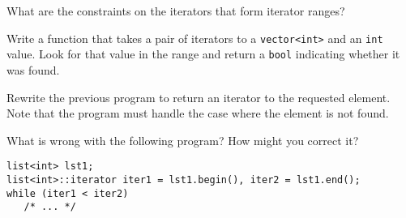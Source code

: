 %
%
\begin{question}
What are the constraints on the iterators that form iterator ranges?
\end{question}

\begin{question}
Write a function that takes a pair of iterators to a
\verb|vector<int>| and an \verb|int| value. Look for that value in the range and return
a \verb|bool| indicating whether it was found.
\end{question}

\begin{question}
Rewrite the previous program to return an iterator to the
requested element. Note that the program must handle the case where the
element is not found.
\end{question}

\begin{question}
What is wrong with the following program? How might you correct it?
\begin{lstlisting}
list<int> lst1;
list<int>::iterator iter1 = lst1.begin(), iter2 = lst1.end();
while (iter1 < iter2)
   /* ... */
\end{lstlisting}
\end{question}
